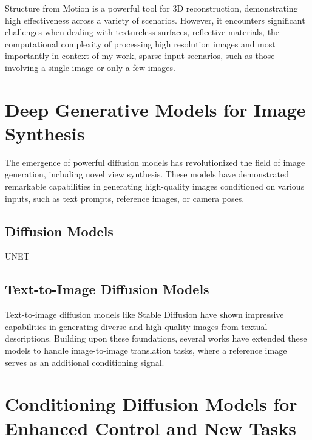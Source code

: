 Structure from Motion is a powerful tool for 3D reconstruction, demonstrating high effectiveness across a variety of scenarios. However, it encounters significant challenges when dealing with textureless surfaces, reflective materials, the computational complexity of processing high resolution images and most importantly in context of my work, sparse input scenarios, such as those involving a single image or only a few images.


\section{Deep Generative Models for Image Synthesis}\label{sec:text-to-image}

The emergence of powerful diffusion models has revolutionized the field of image generation, including novel view synthesis. These models have demonstrated remarkable capabilities in generating high-quality images conditioned on various inputs, such as text prompts, reference images, or camera poses.

\subsection{Diffusion Models}

UNET

\subsection{Text-to-Image Diffusion Models}

Text-to-image diffusion models like Stable Diffusion \cite{stablediffusion} have shown impressive capabilities in generating diverse and high-quality images from textual descriptions. Building upon these foundations, several works have extended these models to handle image-to-image translation tasks, where a reference image serves as an additional conditioning signal.

\section{Conditioning Diffusion Models for Enhanced Control and New Tasks}\label{sec:conditioning-diffusion}

